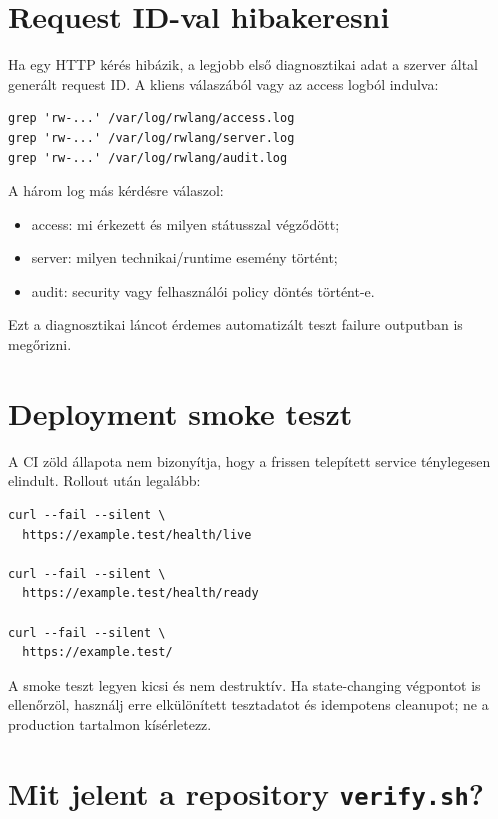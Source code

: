 \section{Request ID-val hibakeresni}

Ha egy HTTP kérés hibázik, a legjobb első diagnosztikai adat a szerver által generált request ID. A kliens válaszából vagy az access logból indulva:

\begin{lstlisting}
grep 'rw-...' /var/log/rwlang/access.log
grep 'rw-...' /var/log/rwlang/server.log
grep 'rw-...' /var/log/rwlang/audit.log
\end{lstlisting}

A három log más kérdésre válaszol:

\begin{itemize}
  \item access: mi érkezett és milyen státusszal végződött;
  \item server: milyen technikai/runtime esemény történt;
  \item audit: security vagy felhasználói policy döntés történt-e.
\end{itemize}

Ezt a diagnosztikai láncot érdemes automatizált teszt failure outputban is megőrizni.

\section{Deployment smoke teszt}

A CI zöld állapota nem bizonyítja, hogy a frissen telepített service ténylegesen elindult. Rollout után legalább:

\begin{lstlisting}
curl --fail --silent \
  https://example.test/health/live

curl --fail --silent \
  https://example.test/health/ready

curl --fail --silent \
  https://example.test/
\end{lstlisting}

A smoke teszt legyen kicsi és nem destruktív. Ha state-changing végpontot is ellenőrzöl, használj erre elkülönített tesztadatot és idempotens cleanupot; ne a production tartalmon kísérletezz.

\section{Mit jelent a repository \texttt{verify.sh}?}

